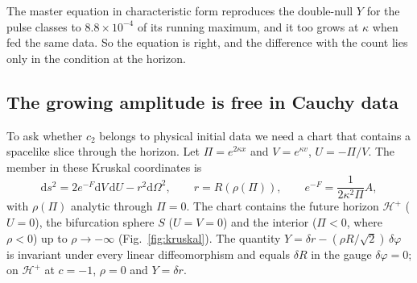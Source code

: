 \documentclass[11pt]{article}
\theoremstyle{plain}
\newcommand{\dd}{\mathrm{d}}
\newcommand{\Hp}{\mathcal H^+}
\begin{document}
The master equation in characteristic form reproduces the double-null $Y$ for the pulse classes to $8.8\times10^{-4}$ of its
running maximum, and it too grows at $\kappa$ when fed the same data. So the equation is right, and the difference with the
count lies only in the condition at the horizon.

\subsection{The growing amplitude is free in Cauchy data}\label{sec:cauchy}

To ask whether $c_2$ belongs to physical initial data we need a chart that contains a spacelike slice through the horizon.
Let $\Pi=e^{2\kappa x}$ and $V=e^{\kappa v}$, $U=-\Pi/V$. The member in these Kruskal coordinates is
\begin{equation}
\dd s^2=2e^{-F}\dd V\,\dd U-r^2\dd\Omega^2,\qquad r=R(\rho(\Pi)),\qquad e^{-F}=\frac{1}{2\kappa^2\Pi}A ,
\end{equation}
with $\rho(\Pi)$ analytic through $\Pi=0$. The chart contains the future horizon $\Hp$ ($U=0$), the bifurcation sphere $S$
($U=V=0$) and the interior ($\Pi<0$, where $\rho<0$) up to $\rho\to-\infty$ (Fig.~\ref{fig:kruskal}). The
quantity $Y=\delta r-(\rho R/\sqrt2)\,\delta\varphi$ is invariant under every linear diffeomorphism and equals $\delta R$ in the
gauge $\delta\varphi=0$; on $\Hp$ at $c=-1$, $\rho=0$ and $Y=\delta r$.
\end{document}
